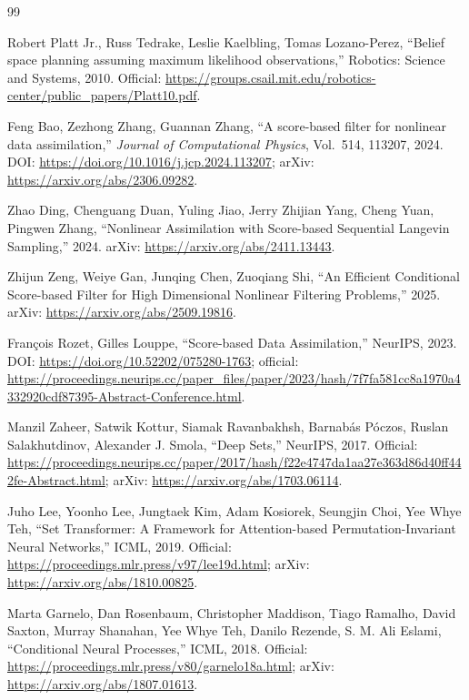 \documentclass[a4paper,11pt]{article}
\begin{document}
\sloppy
\begin{thebibliography}{99}

Robert Platt Jr., Russ Tedrake, Leslie Kaelbling, Tomas Lozano-Perez,
``Belief space planning assuming maximum likelihood observations,''
Robotics: Science and Systems, 2010.
Official: \url{https://groups.csail.mit.edu/robotics-center/public_papers/Platt10.pdf}.

Feng Bao, Zezhong Zhang, Guannan Zhang,
``A score-based filter for nonlinear data assimilation,''
\emph{Journal of Computational Physics}, Vol.~514, 113207, 2024.
DOI: \url{https://doi.org/10.1016/j.jcp.2024.113207};
arXiv: \url{https://arxiv.org/abs/2306.09282}.

Zhao Ding, Chenguang Duan, Yuling Jiao, Jerry Zhijian Yang, Cheng Yuan, Pingwen Zhang,
``Nonlinear Assimilation with Score-based Sequential Langevin Sampling,'' 2024.
arXiv: \url{https://arxiv.org/abs/2411.13443}.

Zhijun Zeng, Weiye Gan, Junqing Chen, Zuoqiang Shi,
``An Efficient Conditional Score-based Filter for High Dimensional Nonlinear Filtering Problems,'' 2025.
arXiv: \url{https://arxiv.org/abs/2509.19816}.

Fran\c{c}ois Rozet, Gilles Louppe,
``Score-based Data Assimilation,'' NeurIPS, 2023.
DOI: \url{https://doi.org/10.52202/075280-1763};
official: \url{https://proceedings.neurips.cc/paper_files/paper/2023/hash/7f7fa581cc8a1970a4332920cdf87395-Abstract-Conference.html}.

Manzil Zaheer, Satwik Kottur, Siamak Ravanbakhsh, Barnab\'as P\'oczos,
Ruslan Salakhutdinov, Alexander J. Smola,
``Deep Sets,'' NeurIPS, 2017.
Official: \url{https://proceedings.neurips.cc/paper/2017/hash/f22e4747da1aa27e363d86d40ff442fe-Abstract.html};
arXiv: \url{https://arxiv.org/abs/1703.06114}.

Juho Lee, Yoonho Lee, Jungtaek Kim, Adam Kosiorek, Seungjin Choi, Yee Whye Teh,
``Set Transformer: A Framework for Attention-based Permutation-Invariant Neural Networks,''
ICML, 2019.
Official: \url{https://proceedings.mlr.press/v97/lee19d.html};
arXiv: \url{https://arxiv.org/abs/1810.00825}.

Marta Garnelo, Dan Rosenbaum, Christopher Maddison, Tiago Ramalho, David Saxton,
Murray Shanahan, Yee Whye Teh, Danilo Rezende, S. M. Ali Eslami,
``Conditional Neural Processes,'' ICML, 2018.
Official: \url{https://proceedings.mlr.press/v80/garnelo18a.html};
arXiv: \url{https://arxiv.org/abs/1807.01613}.


\end{thebibliography}
\end{document}

